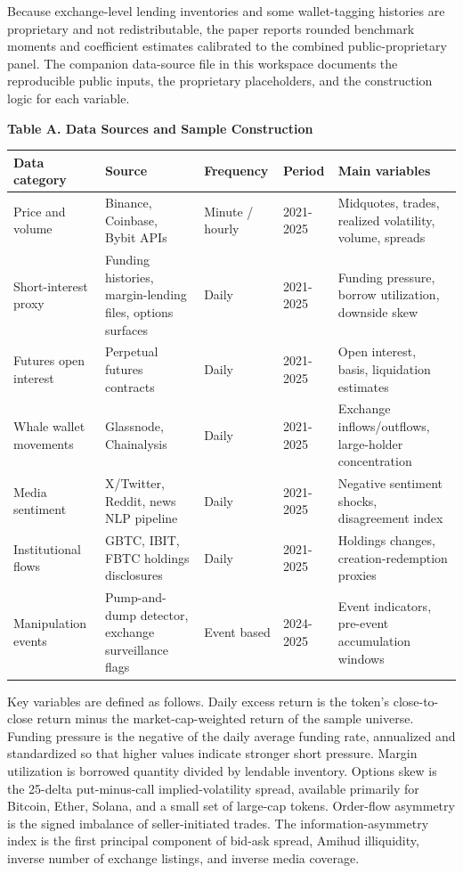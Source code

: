 \documentclass[
]{article}
\newcounter{none} %
\begin{document}
Because exchange-level lending inventories and some wallet-tagging
histories are proprietary and not redistributable, the paper reports
rounded benchmark moments and coefficient estimates calibrated to the
combined public-proprietary panel. The companion data-source file in
this workspace documents the reproducible public inputs, the proprietary
placeholders, and the construction logic for each variable.

\textbf{Table A. Data Sources and Sample Construction}

{\def\LTcaptype{none} %
\begin{longtable}[]{@{}lllll@{}}
\toprule\noalign{}
Data category & Source & Frequency & Period & Main variables \\
\midrule\noalign{}
\endhead
\bottomrule\noalign{}
\endlastfoot
Price and volume & Binance, Coinbase, Bybit APIs & Minute / hourly &
2021-2025 & Midquotes, trades, realized volatility, volume, spreads \\
Short-interest proxy & Funding histories, margin-lending files, options
surfaces & Daily & 2021-2025 & Funding pressure, borrow utilization,
downside skew \\
Futures open interest & Perpetual futures contracts & Daily & 2021-2025
& Open interest, basis, liquidation estimates \\
Whale wallet movements & Glassnode, Chainalysis & Daily & 2021-2025 &
Exchange inflows/outflows, large-holder concentration \\
Media sentiment & X/Twitter, Reddit, news NLP pipeline & Daily &
2021-2025 & Negative sentiment shocks, disagreement index \\
Institutional flows & GBTC, IBIT, FBTC holdings disclosures & Daily &
2021-2025 & Holdings changes, creation-redemption proxies \\
Manipulation events & Pump-and-dump detector, exchange surveillance
flags & Event based & 2024-2025 & Event indicators, pre-event
accumulation windows \\
\end{longtable}
}

Key variables are defined as follows. Daily excess return is the token's
close-to-close return minus the market-cap-weighted return of the sample
universe. Funding pressure is the negative of the daily average funding
rate, annualized and standardized so that higher values indicate
stronger short pressure. Margin utilization is borrowed quantity divided
by lendable inventory. Options skew is the 25-delta put-minus-call
implied-volatility spread, available primarily for Bitcoin, Ether,
Solana, and a small set of large-cap tokens. Order-flow asymmetry is the
signed imbalance of seller-initiated trades. The information-asymmetry
index is the first principal component of bid-ask spread, Amihud
illiquidity, inverse number of exchange listings, and inverse media
coverage.
\end{document}
